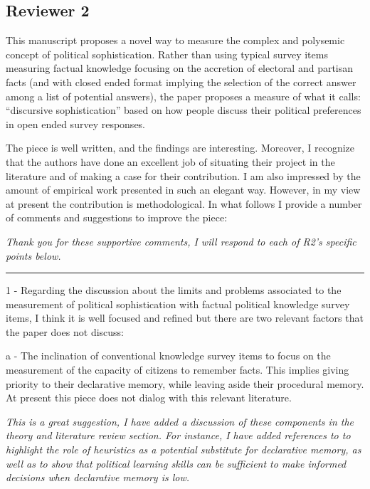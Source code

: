 

\subsection*{Reviewer 2}

This manuscript proposes a novel way to measure the complex and polysemic concept of political sophistication. Rather than using typical survey items measuring factual knowledge focusing on the accretion of electoral and partisan facts (and with closed ended format implying the selection of the correct answer among a list of potential answers), the paper proposes a measure of what it calls: ``discursive sophistication'' based on how people discuss their political preferences in open ended survey responses. 

The piece is well written, and the findings are interesting. Moreover, I recognize that the authors have done an excellent job of situating their project in the literature and of making a case for their contribution. I am also impressed by the amount of empirical work presented in such an elegant way. However, in my view at present the contribution is methodological. In what follows I provide a number of comments and suggestions to improve the piece:

\textit{Thank you for these supportive comments, I will respond to each of R2's specific points below.}


\rule{\linewidth}{.01cm}

1 - Regarding the discussion about the limits and problems associated to the measurement of political sophistication with factual political knowledge survey items, I think it is well focused and refined but there are two relevant factors that the paper does not discuss: 

a - The inclination of conventional knowledge survey items to focus on the measurement of the capacity of citizens to remember facts. This implies giving priority to their declarative memory, while leaving aside their procedural memory. At present this piece does not dialog with this relevant literature.

\textit{This is a great suggestion, I have added a discussion of these components in the theory and literature review section. For instance, I have added references to \citet{lupia1994shortcuts} to highlight the role of heuristics as a potential substitute for declarative memory, as well as \citep{prior2008money} to show that political learning skills can be sufficient to make informed decisions when declarative memory is low.}

